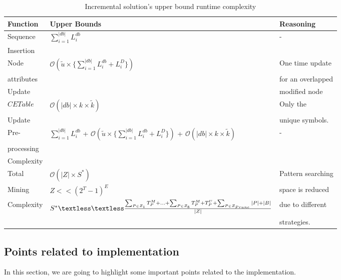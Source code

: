 \begin{table}[!t]
\small
\centering
\begin{tabular}{|l|l|l|}
\hline
Function & Upper Bounds & Reasoning \\
\hline
Sequence &  $\sum_{i=1}^{|db|}L_{i}^{db}$ & -\\ 
Insertion  & & \\ 
\hline
Node  & $\mathcal{O}(\widetilde{u} \times \{ \sum_{i=1}^{|db|} L_{i}^{db}+L_{i}^{D}\})$ & One time update  \\ 
attributes & & for an overlapped \\ 
 Update & & modified node\\ 
 \hline
$CETable$ & $\mathcal{O}(|db| \times k \times \widetilde{k})$ & Only the \\ 
Update & & unique symbols.\\ 
\hline
Pre- & $\sum_{i=1}^{|db|}L_{i}^{db}$ + $\mathcal{O}(\widetilde{u}  \times \{ \sum_{i=1}^{|db|} L_{i}^{db}+L_{i}^{D} \} )$ + $\mathcal{O}(|db| \times k \times \widetilde{k})$ & -\\ 
processing & & \\ 
Complexity & & \\ 
 \hline 
Total &  $\mathcal{O}(|Z| \times S^{*})$ & Pattern searching  \\ 
Mining  &  $Z << (2^{T}-1)^{E}$ & space is reduced \\ 
Complexity & $S^{*} \textless \textless \frac{\sum_{P\in Z_{1}} T_{P}^{M} + ...+\sum_{P\in Z_{8}} T_{P}^{M}+T_{P}^{U} + \sum_{P \in Z_{Prune}} |P| + |B| }{|Z|}$ & due to different\\
& & strategies. \\ 
\hline
\end{tabular}
\caption{Incremental solution's upper bound runtime complexity}
\label{table:runtime_complexity_inc_tree_miner}
\end{table}


\subsection{Points related to implementation}
In this section, we are going to highlight some important points related to the implementation. 

